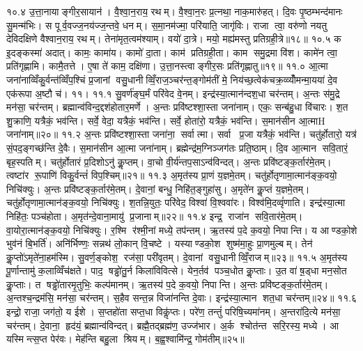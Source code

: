 १०.४
उ॒त्ता॒नायाङ्गीर॒सायान॑। वै॒श्वा॒न॒राय॒ रथम्। वै॒श्वा॒न॒रः प्र॒त्नथा॒ नाक॒मारु॑हत्। दि॒वः पृ॒ष्ठम्भन्द॑मानः सु॒मन्म॑भिः। स पूर्व॒वज्ज॒नय॑ज्ज॒न्तवे॒ धनम्। स॒मा॒नम॑ज्मा॒ परि॑याति॒ जागृ॑विः। राजा त्वा॒ वरु॑णो नयतु देविदक्षिणे वैश्वान॒राय॒ रथम्। तेना॑मृत॒त्वम॑श्याम्। वयो॑ दा॒त्रे। मयो॒ मह्य॑मस्तु प्रतिग्रही॒त्रे॥१८॥
१०.५
क इ॒दङ्कस्मा॑ अदात्। कामः॒ कामा॑य। कामो॑ दा॒ता। काम॑ प्रतिग्रही॒ता। काम समु॒द्रमा वि॑श। कामे॑न त्वा॒ प्रति॑गृह्णामि। कामै॒तत्ते। ए॒षा ते॑ काम॒ दक्षि॑णा। उ॒त्ता॒नस्त्वाङ्गीर॒सः प्रति॑गृह्णातु॥१९॥
११.०
आ॒त्मा जना॑नाव्विँकु॒र्वन्त॑व्विँप॒श्चिं प्र॒जानां वसु॒धानीव्विँ॒राज॒ञ्चर॑न्त॒ङ्गोम॑तीं मे॒ निय॑च्छ॒त्वेक॑चक्र॒व्व्योँ॑मन्मा॒यया॑ दे॒व एक॑रूपा अ॒ष्टौ च॑। ११।
\anuvakamend
११.१
सु॒वर्ण॑ङ्घ॒र्मं परि॑वेद वे॒नम्। इन्द्र॑स्या॒त्मान॑न्दश॒धा चर॑न्तम्। अ॒न्तः स॑मु॒द्रे मन॑सा॒ चर॑न्तम्। ब्रह्मान्व॑विन्द॒द्दश॑होतार॒मर्णे। अ॒न्तः प्रवि॑ष्टश्शा॒स्ता जना॑नाम्। एकः॒ सन्ब॑हु॒धा वि॑चारः। श॒त शु॒क्राणि॒ यत्रैकं॒ भव॑न्ति। सर्वे॒ वेदा॒ यत्रैकं॒ भव॑न्ति। सर्वे॒ होता॑रो॒ यत्रैकं॒ भव॑न्ति। स॒मान॑सीन आ॒त्माH जना॑नाम्॥२०॥%
११.२
अ॒न्तः प्रवि॑ष्टश्शा॒स्ता जना॑ना॒ सर्वात्मा। सर्वा प्र॒जा यत्रैकं॒ भव॑न्ति। चतु॑र्\mbox{}होतारो॒ यत्र॑ सं॒पद॒ङ्गच्छ॑न्ति दे॒वैः। स॒मान॑सीन आ॒त्मा जना॑नाम्। ब्रह्मेन्द्र॑म॒ग्निञ्जग॑तः प्रति॒ष्ठाम्। दि॒व आ॒त्मान सवि॒तारं॒ बृह॒स्पतिम्। चतु॑र्\mbox{}होतारं प्र॒दिशोऽनु॑ कॢ॒प्तम्। वा॒चो वी॒र्य॑न्तप॒साऽन्व॑विन्दत्। अ॒न्तः प्रवि॑ष्टङ्क॒र्तार॑मे॒तम्। त्वष्टा॑र रू॒पाणि॑ विकु॒र्वन्तं॑ विप॒श्चिम्॥२१॥
११.३
अ॒मृत॑स्य प्रा॒णं य॒ज्ञमे॒तम्। चतु॑र्\mbox{}होतृणामा॒त्मान॑ङ्क॒वयो॒ निचि॑क्युः। अ॒न्तः प्रवि॑ष्टङ्क॒र्तार॑मे॒तम्। दे॒वानां॒ बन्धु॒ निहि॑त॒ङ्गुहा॑सु। अ॒मृते॑न कॢ॒प्तं य॒ज्ञमे॒तम्। चतु॑र्\mbox{}होतृणामा॒त्मान॑ङ्क॒वयो॒ निचि॑क्युः। श॒तन्नि॒युतः॒ परि॑वेद॒ विश्वा॑ वि॒श्ववा॑रः। विश्व॑मि॒दव्वृं॑णाति। इन्द्र॑स्या॒त्मा निहि॑तः॒ पञ्च॑होता। अ॒मृत॑न्दे॒वाना॒मायु॑ प्र॒जानाम्॥२२॥%
११.४
इन्द्र॒ राजा॑न सवि॒तार॑मे॒तम्। वा॒योरा॒त्मान॑ङ्क॒वयो॒ निचि॑क्युः। र॒श्मि र॑श्मी॒नां मध्ये॒ तप॑न्तम्। ऋ॒तस्य॑ प॒दे क॒वयो॒ निपान्ति। य आण्डको॒शे भुव॑नं बि॒भर्ति॑। अनि॑र्भिण्णः॒ सन्नथ॑ लो॒कान् वि॒चष्टे। यस्याण्डको॒श शुष्म॑मा॒हुः प्रा॒णमुल्बम्। तेन॑ कॢ॒प्तो॑ऽमृते॑ना॒हम॑स्मि। सु॒वर्ण॒ङ्कोश॒ रज॑सा॒ परी॑वृतम्। दे॒वानां वसु॒धानीव्विँ॒राजम्॥२३॥%
११.५
अ॒मृत॑स्य पू॒र्णान्तामु॑ क॒लाव्विँच॑क्षते। पाद॒ षड्ढो॑तु॒र्न किला॑विवित्से। येन॒र्तव॑ पञ्च॒धोत कॢ॒प्ताः। उ॒त वा॑ ष़॒ड्धा मन॒सोत कॢ॒प्ताः। त षड्ढो॑तारमृ॒तुभिः॒ कल्प॑मानम्। ऋ॒तस्य॑ प॒दे क॒वयो॒ निपान्ति। अ॒न्तः प्रवि॑ष्टङ्क॒र्तार॑मे॒तम्। अ॒न्तश्च॒न्द्रम॑सि॒ मन॑सा॒ चर॑न्तम्। स॒हैव सन्त॒न्न विजा॑नन्ति दे॒वाः। इन्द्र॑स्या॒त्मान शत॒धा चर॑न्तम्॥२४॥%
११.६
इन्द्रो॒ राजा॒ जग॑तो॒ य ईशे। स॒प्तहो॑ता सप्त॒धा विकॢ॑प्तः। परे॑ण॒ तन्तुं॑ परिषि॒च्यमा॑नम्। अ॒न्तरा॑दि॒त्ये मन॑सा॒ चर॑न्तम्। दे॒वाना॒ हृद॑यं॒ ब्रह्मान्व॑विन्दत्। ब्रह्मै॒तद्ब्रह्म॑ण॒ उज्ज॑भार। अ॒र्क श्चोत॑न्त सरि॒रस्य॒ मध्ये। आ यस्मिन्त्स॒प्त पेर॑वः। मेह॑न्ति बहु॒ला श्रियम्। ब॒ह्व॒श्वामि॑न्द्र॒ गोम॑तीम्॥२५॥%
